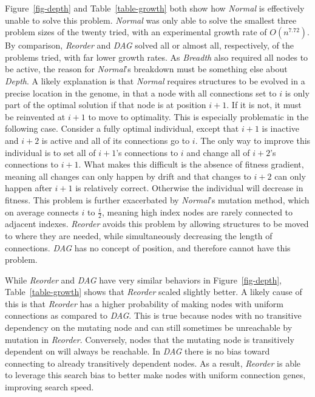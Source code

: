 \documentclass{sig-alternate}
\begin{document}
Figure~\ref{fig-depth} and Table~\ref{table-growth} both show how \emph{Normal}
is effectively unable to solve this problem.  \emph{Normal} was only able to solve
the smallest three problem sizes of the twenty tried, with an experimental growth
rate of $O(n^{7.72})$.  By comparison, \emph{Reorder} and \emph{DAG} solved all
or almost all, respectively, of the problems tried, with far lower growth rates.
As \emph{Breadth} also required all nodes to be active, the reason for \emph{Normal}'s
breakdown must be something else about \emph{Depth}.  A likely explanation is that
\emph{Normal} requires structures to be evolved in a precise location in the genome,
in that a node with all connections set to $i$ is only part of the optimal solution
if that node is at position $i+1$.  If it is not, it must be reinvented at $i+1$ to
move to optimality.  This is especially problematic in the following case.  Consider
a fully optimal individual, except that $i+1$ is inactive and $i+2$ is active and
all of its connections go to $i$.  The only way to improve this individual is to
set all of $i+1$'s connections to $i$ and change all of $i+2$'s connections to $i+1$.
What makes this difficult is the absence of fitness gradient, meaning all changes can
only happen by drift and that changes to $i+2$ can only happen after $i+1$ is relatively
correct.  Otherwise the individual will decrease in fitness.  This problem is further
exacerbated by \emph{Normal}'s mutation method, which on average connects $i$ to $\frac{i}{2}$,
meaning high index nodes are rarely connected to adjacent indexes.
\emph{Reorder} avoids this problem by allowing structures to be moved to where they are
needed, while simultaneously decreasing the length of connections.  \emph{DAG} has
no concept of position, and therefore cannot have this problem.

While \emph{Reorder} and \emph{DAG} have very similar behaviors in Figure~\ref{fig-depth},
Table~\ref{table-growth} shows that \emph{Reorder} scaled slightly better.  A likely
cause of this is that \emph{Reorder} has a higher probability of making nodes
with uniform connections as compared to \emph{DAG}.  This is true
because nodes with no transitive dependency on the mutating node
and can still sometimes be unreachable by mutation in \emph{Reorder}.  Conversely, nodes
that the mutating node is transitively dependent on will always be reachable.  In \emph{DAG}
there is no bias toward connecting to already transitively dependent nodes.
As a result, \emph{Reorder} is able to leverage this
search bias to better make nodes with uniform connection genes, improving search speed.
\end{document}
